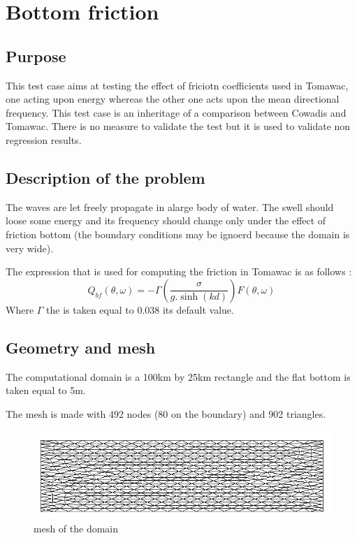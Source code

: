 \section{Bottom friction}
%

%
\subsection{Purpose}
%
This test case aims at testing the effect of friciotn coefficients used in
Tomawac, one acting upon energy whereas the other one acts upon the mean
directional frequency. This test case is an inheritage of a comparison between
Cowadis and Tomawac. There is no measure to validate the test but it is used to
validate non regression results.



%
\subsection{Description of the problem}
The waves are let freely propagate in alarge body of water. The swell should
loose some energy and its frequency should change only under the effect of
friction bottom (the boundary conditions may be ignoerd because the domain is
very wide).

The expression that is used for computing the friction in Tomawac is as follows :
\begin{equation}
Q_{bf}(\theta,\omega)=-\Gamma (\frac{\sigma}{g.\sinh(kd)})F(\theta,\omega)
\end{equation}
Where $\Gamma$ the  is taken equal to 0.038 its
default value.

\subsection{Geometry and mesh}
The computational domain is a 100km by 25km rectangle and the flat bottom is
taken equal to 5m.

The mesh is made with 492 nodes (80 on the boundary) and 902 triangles.

\begin{figure} [!h]
\centering
\includegraphics[scale = 0.65]{maillage.png}
 \caption{mesh of the domain}\label{mailbf}
\end{figure}

